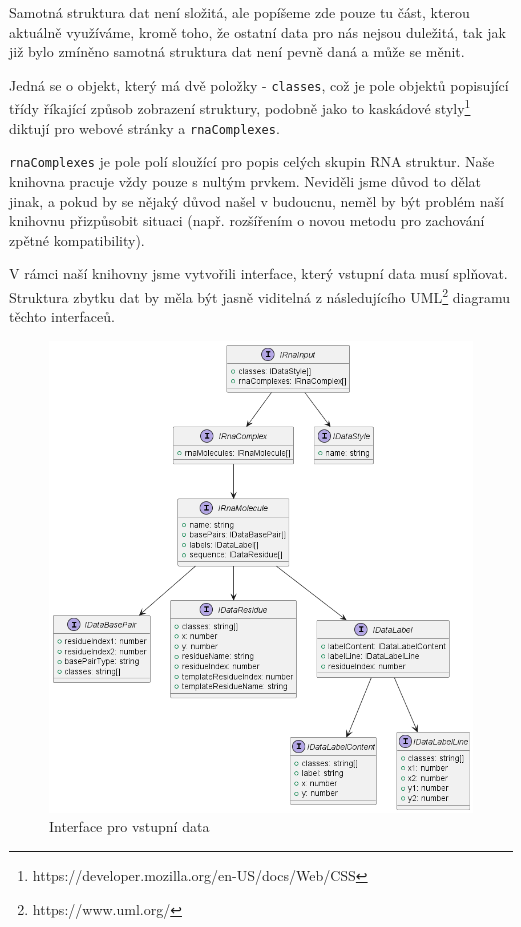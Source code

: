 Samotná struktura dat není složitá, ale popíšeme zde pouze tu část, kterou
aktuálně využíváme, kromě toho, že ostatní data pro nás nejsou duležitá, tak
jak již bylo zmíněno samotná struktura dat není pevně daná a může se měnit.

Jedná se o objekt, který má dvě položky - \texttt{classes}, což je pole objektů
popisující třídy říkající způsob zobrazení struktury, podobně jako to kaskádové
styly\footnote{https://developer.mozilla.org/en-US/docs/Web/CSS} diktují pro
webové stránky a \texttt{rnaComplexes}. 

\texttt{rnaComplexes} je pole polí sloužící pro popis celých skupin RNA
struktur. Naše knihovna pracuje vždy pouze s nultým prvkem. Neviděli jsme důvod
to dělat jinak, a pokud by se nějaký důvod našel v budoucnu, neměl by být
problém naší knihovnu přizpůsobit situaci (např. rozšířením o novou metodu pro
zachování zpětné kompatibility).

V rámci naší knihovny jsme vytvořili interface, který vstupní data musí
splňovat. Struktura zbytku dat by měla být jasně viditelná z následujícího
UML\footnote{https://www.uml.org/} diagramu těchto interfaceů.

\begin{figure}[H]
  \centering
  \includegraphics[width=145mm]{../img/rnaInput.png}
  \caption{Interface pro vstupní data}
\end{figure}

